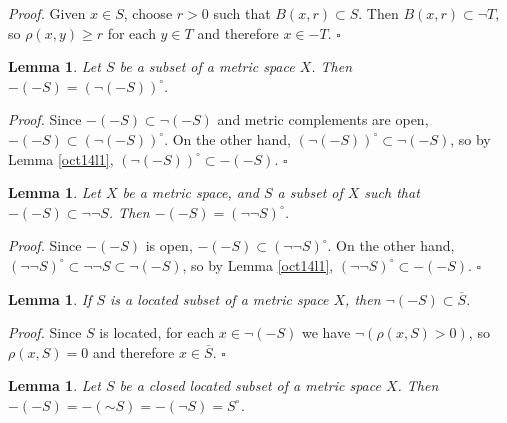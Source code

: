 \documentclass[11pt]{article}%
\newtheorem{lemma}[theorem]{Lemma}
\newenvironment{proof}[1][Proof]{\noindent\textit{#1.} }{}
\begin{document}
\begin{proof}
Given $x\in S$, choose $r>0$ such that $B(x,r)\subset S$. Then $B(x,r)\subset
\lnot T$, so $\rho(x,y)\geq r$ for each $y\in T$ and therefore $x\in-T$.%
\hfill
$\square$
\end{proof}

\begin{lemma}
\label{oct03l2}Let $S$ be a subset of a metric space $X$. Then $-(-S)=\left(
\lnot(-S)\right)  ^{\circ}.$
\end{lemma}

\begin{proof}
Since $-(-S)\subset\lnot(-S)$ and metric complements are open, $-(-S)\subset
\left(  \lnot(-S)\right)  ^{\circ}$. On the other hand, $\left(
\lnot(-S)\right)  ^{\circ}\subset\lnot(-S)$, so by Lemma \ref{oct14l1},
$\left(  \lnot(-S)\right)  ^{\circ}\subset-(-S).$%
\hfill
$\square$
\end{proof}

\begin{lemma}
\label{mar21l0}Let $X$ be a metric space, and $S$ a subset of $X$ such that
$-(-S)\subset\lnot\lnot S$. Then $-(-S)=\left(  \lnot\lnot S\right)  ^{\circ}$.
\end{lemma}

\begin{proof}
Since $-(-S)$ is open, $-(-S)\subset\left(  \lnot\lnot S\right)  ^{\circ}$. On
the other hand, $\left(  \lnot\lnot S\right)  ^{\circ}\subset\lnot\lnot
S\subset\lnot(-S)$, so by Lemma \ref{oct14l1}, $\left(  \lnot\lnot S\right)
^{\circ}\subset-(-S)$.%
\hfill
$\square$
\end{proof}

\begin{lemma}
\label{mar21l2}If $S$ is a located subset of a metric space $X$, then
$\lnot(-S)\subset\overline{S}$.
\end{lemma}

\begin{proof}
Since $S$ is located, for each $x\in\lnot(-S)$ we have $\lnot\left(
\rho(x,S)>0\right)  $, so $\rho(x,S)=0$ and therefore $x\in\overline{S}$.%
\hfill
$\square$
\end{proof}

\begin{lemma}
\label{sept27l2}Let $S$ be a closed located subset of a metric space $X$. Then
$-(-S)=-(%
\mathord{\sim}%
S)=-(\lnot S)=S^{\circ}$.
\end{lemma}
\end{document}
